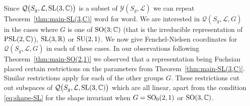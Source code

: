 \documentclass[11pt]{amsart}
\newtheorem{theorem}{Theorem}[section]
\numberwithin{equation}{section}
\begin{document}
%




Since ${\mathcal Q}\bigl(S_g,{\mathcal L},{\rm SL}(3,{\mathbb C})\bigr)$ is a subset of ${\mathcal Y}(S_g,{\mathcal L})$
we can repeat Theorem~\ref{thm:main-SL(3,C)} word for word. 
We are interested in ${\mathcal Q}(S_g,{\mathcal L},G)$ in the cases where 
$G$ is one of ${\rm SO}(3;{\mathbb C})$ (that is the irreducible representation of 
${\rm PSL}(2,{\mathbb C})$), ${\rm SL}(3,{\mathbb R})$ or ${\rm SU}(2,1)$. 
We now give Fenchel-Nielsen coordinates for ${\mathcal Q}(S_g,{\mathcal L},G)$ in each of these cases. 
In our observations following Theorem~\ref{thm:main-SO(2,1)} we observed that a representation being 
Fuchsian placed certain restrictions on the parameters from Theorem~\ref{thm:main-SL(3,C)}. Similar
restrictions apply for each of the other groups $G$. These restrictions cut out subspaces of 
${\mathcal Q}\bigl(S_g,{\mathcal L},{\rm SL}(3,{\mathbb C})\bigr)$ which are all linear, apart from the condition
\eqref{eq:shape-SL} for the shape invariant when $G={\rm SO}_0(2,1)$ or ${\rm SO}(3,{\mathbb C})$.
\end{document}
